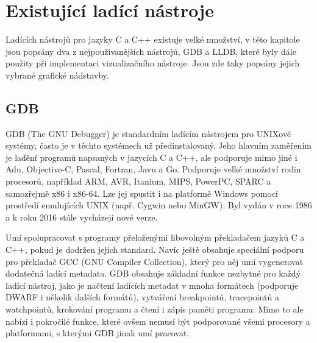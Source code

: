 \documentclass[bc,male,java,dept460]{diploma}						%
\begin{document}
		
\section {Existující ladící nástroje}
	Ladících nástrojů pro jazyky C a C++ existuje velké množství, v této kapitole jsou popsány dva z nejpoužívanějších nástrojů, GDB a LLDB, které byly dále
	použity při implementaci vizualizačního nástroje. Jsou zde taky popsány jejich vybrané grafické nádstavby.

	\subsection{GDB}
		GDB (The GNU Debugger) je standardním ladícím nástrojem pro UNIXové systémy, často je v těchto systémech už předinstalovaný.
		Jeho hlavním zaměřením je ladění programů napsaných v jazycích C a C++, ale podporuje mimo jiné i Adu, Objective-C, Pascal, Fortran, Javu
		a Go\cite{gdb-languages}. Podporuje velké množství rodin procesorů, například ARM, AVR, Itanium, MIPS, PowerPC, SPARC a samozřejmě x86 i x86-64.
		Lze jej spustit i na platformě Windows pomocí prostředí emulujících UNIX (např. Cygwin nebo MinGW). Byl vydán v roce 1986 a k roku
		2016 stále vycházejí nové verze.
		
		\par Umí spolupracovat s programy přeloženými libovolným překladačem jazyků C a C++, pokud je dodržen jejich standard. Navíc ještě obsahuje
		speciální podporu pro překladač GCC (GNU Compiler Collection), který pro něj umí vygenerovat dodatečná ladící metadata.
		GDB obsahuje základní funkce nezbytné pro každý ladící nástroj, jako je načtení ladících metadat v mnoha formátech (podporuje DWARF i několik dalších
		formátů), vytváření breakpointů, tracepointů a watchpointů, krokování programu a čtení i zápis paměti programu.
		Mimo to ale nabízí i pokročilé funkce, které ovšem nemusí být podporované všemi procesory a platformami, s kterými GDB jinak umí pracovat.
		
\end{document}
